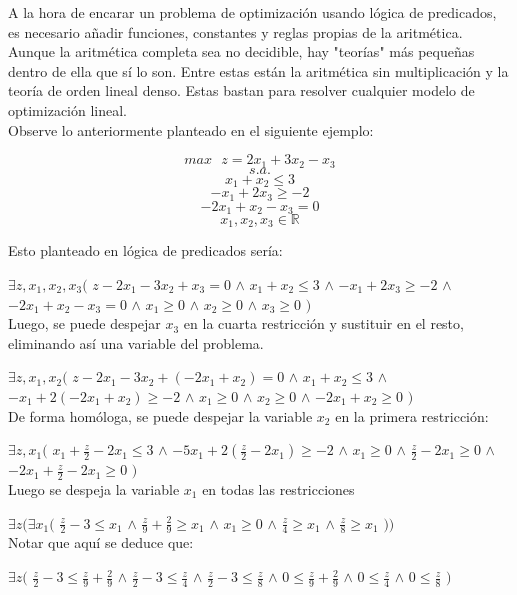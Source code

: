 \documentclass[12pt]{report}
\begin{document}
A la hora de encarar un problema de optimización usando lógica de predicados, es necesario añadir funciones, constantes y reglas propias de la aritmética. Aunque la aritmética completa sea no decidible, hay "teorías" más pequeñas dentro de ella que sí lo son. Entre estas están la aritmética sin multiplicación y la teoría de orden lineal denso. Estas bastan para resolver cualquier modelo de optimización lineal.\\

Observe lo anteriormente planteado en el siguiente ejemplo:

$$max \text{ }z= 2x_1 + 3x_2 - x_3 $$
$$s.a.$$
$$ x_1 + x_2 \leq  3 $$
$$ -x_1 + 2x_3 \geq  -2 $$
$$ -2x_1 + x_2 - x_3 = 0 $$
$$ x_1, x_2, x_3 \in \mathbb{R}  $$

Esto planteado en lógica de predicados sería:

$\exists z,x_1,x_2,x_3 ($
$z - 2x_1 - 3x_2 + x_3 = 0$ $\land$
$ x_1 + x_2 \leq  3 $ $\land$
$ -x_1 + 2x_3 \geq  -2 $ $\land$
$ -2x_1 + x_2 - x_3 = 0 $ $\land$
$ x_1\geq  0 $ $\land$ 
$ x_2\geq  0 $ $\land$ 
$ x_3\geq  0 $ 
$)$\\

Luego, se puede despejar $x_3$ en la cuarta restricción y sustituir en el resto, eliminando así una variable del problema.

$\exists z,x_1,x_2($
$z - 2x_1 - 3x_2 + (-2x_1 + x_2) = 0$ $\land$
$ x_1 + x_2 \leq  3 $ $\land$
$ -x_1 + 2(-2x_1 + x_2) \geq  -2 $ $\land$
$ x_1\geq  0 $ $\land$ 
$ x_2\geq  0 $ $\land$ 
$ -2x_1 + x_2\geq  0 $ 
$)$\\

De forma homóloga, se puede despejar la variable $x_2$ en la primera restricción:

$\exists z,x_1 ($
$ x_1 + \frac z 2 -2x_1 \leq  3 $ $\land$
$ -5x_1 + 2(\frac z 2 -2x_1) \geq  -2 $ $\land$
$ x_1\geq  0 $ $\land$ 
$ \frac z 2 -2x_1 \geq  0 $ $\land$ 
$ -2x_1 + \frac z 2 -2x_1 \geq  0 $
$)$\\

Luego se despeja la variable $x_1$ en todas las restricciones

$\exists z (\exists x_1 ($
$ \frac z 2 - 3 \leq   x_1 $ $\land$
$ \frac z 9 + \frac 2 9 \geq  x_1 $ $\land$
$ x_1\geq  0 $ $\land$ 
$ \frac z 4 \geq  x_1 $ $\land$ 
$ \frac z 8 \geq  x_1 $ $))$\\

Notar que aquí se deduce que:

$\exists z ($
$ \frac z 2 - 3 \leq   \frac z 9 + \frac 2 9 $ $\land$
$ \frac z 2 - 3 \leq  \frac z 4  $ $\land$
$ \frac z 2 - 3 \leq  \frac z 8 $ $\land$
$ 0 \leq   \frac z 9 + \frac 2 9 $ $\land$
$ 0 \leq  \frac z 4  $ $\land$
$ 0 \leq  \frac z 8 $ 
$)$\\
\end{document}
